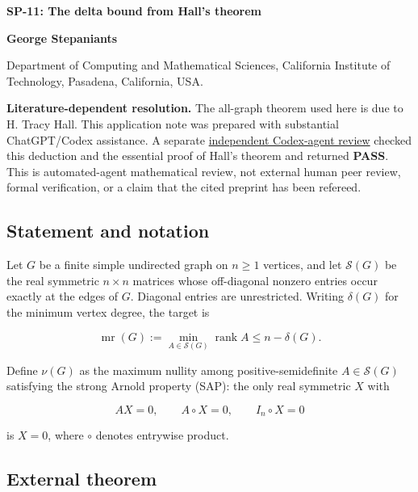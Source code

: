 \documentclass[10pt,a4paper]{article}
\begin{document}
{\raggedright\Large\bfseries SP-11: The delta bound from Hall's
theorem\par}
\vspace{0.4em}
{\normalsize\bfseries George Stepaniants\par}
{\small Department of Computing and Mathematical Sciences, California
Institute of Technology, Pasadena, California, USA.\par}
\vspace{0.6em}
\pagestyle{plain}

\textbf{Literature-dependent resolution.} The all-graph theorem used
here is due to H. Tracy Hall. This application note was prepared with
substantial ChatGPT/Codex assistance. A separate
\href{https://github.com/ajt60gaibb/OpenProblemsInNLA/blob/main/references/stepaniants-sp11-sp12-2026-09-11/verification/SP-11-SP-12-independent-review.md}{independent
Codex-agent review} checked this deduction and the essential proof of
Hall's theorem and returned \textbf{PASS}. This is automated-agent
mathematical review, not external human peer review, formal
verification, or a claim that the cited preprint has been refereed.

\subsection{Statement and notation}\label{statement-and-notation}

Let \(G\) be a finite simple undirected graph on \(n\ge1\) vertices, and
let \(\mathcal S(G)\) be the real symmetric \(n\times n\) matrices whose
off-diagonal nonzero entries occur exactly at the edges of \(G\).
Diagonal entries are unrestricted. Writing \(\delta(G)\) for the minimum
vertex degree, the target is

\[
\operatorname{mr}(G):=\min_{A\in\mathcal S(G)}\operatorname{rank}A
\le n-\delta(G).
\]

Define \(\nu(G)\) as the maximum nullity among positive-semidefinite
\(A\in\mathcal S(G)\) satisfying the strong Arnold property (SAP): the
only real symmetric \(X\) with

\[
AX=0,\qquad A\circ X=0,\qquad I_n\circ X=0
\]

is \(X=0\), where \(\circ\) denotes entrywise product.

\subsection{External theorem}\label{external-theorem}
\end{document}
